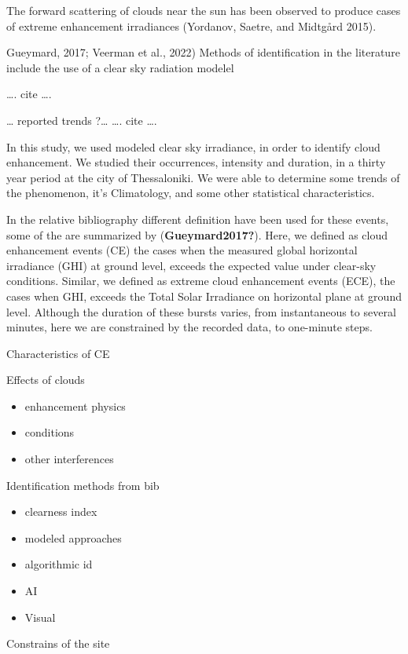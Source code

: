 \documentclass[
]{article}
\providecommand{\tightlist}{%
  \setlength{\itemsep}{0pt}\setlength{\parskip}{0pt}}
\begin{document}
The forward scattering of clouds near the sun has been observed to produce cases of
extreme enhancement irradiances (Yordanov, Saetre, and Midtgård 2015).

Gueymard, 2017; Veerman et al., 2022)
Methods of identification in the literature include the use of a clear sky radiation
modelel

\ldots. cite \ldots.

\ldots{} reported trends ?\ldots{}
\ldots. cite \ldots.

In this study, we used modeled clear sky irradiance, in order to identify cloud
enhancement. We studied their occurrences, intensity and duration, in a thirty year
period at the city of Thessaloniki. We were able to determine some trends of the
phenomenon, it's Climatology, and some other statistical characteristics.

In the relative bibliography different definition have been used for these events, some of
the are summarized by (\textbf{Gueymard2017?}).
Here, we defined as cloud enhancement events (CE) the cases when the measured
global horizontal irradiance (GHI) at ground level, exceeds the expected value under
clear-sky conditions.
Similar, we defined as extreme cloud enhancement events (ECE), the cases when GHI,
exceeds the Total Solar Irradiance on horizontal plane at ground level.
Although the duration of these bursts varies, from instantaneous to several minutes,
here we are constrained by the recorded data, to one-minute steps.

Characteristics of CE

Effects of clouds

\begin{itemize}
\tightlist
\item
  enhancement physics
\item
  conditions
\item
  other interferences
\end{itemize}

Identification methods from bib

\begin{itemize}
\tightlist
\item
  clearness index
\item
  modeled approaches
\item
  algorithmic id
\item
  AI
\item
  Visual
\end{itemize}

Constrains of the site
\end{document}
